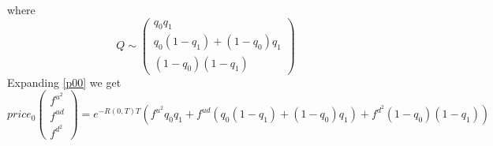 where
\begin{equation}
    Q \sim \left(
    \begin{matrix}
        q_0q_1 \\ q_0(1-q_1)+(1-q_0)q_1 \\ (1-q_0)(1-q_1)
    \end{matrix}
    \right)
\end{equation}
Expanding \eqref{p00} we get
\begin{equation}
    price_0
    \left(
    \begin{matrix}
        f^{u^2} \\ f^{ud} \\ f^{d^2}
    \end{matrix}
    \right)
    = e^{-R(0,T)T}(f^{u^2}q_0q_1 + f^{ud}(q_0(1-q_1)+(1-q_0)q_1) + f^{d^2}(1-q_0)(1-q_1))
\end{equation}
